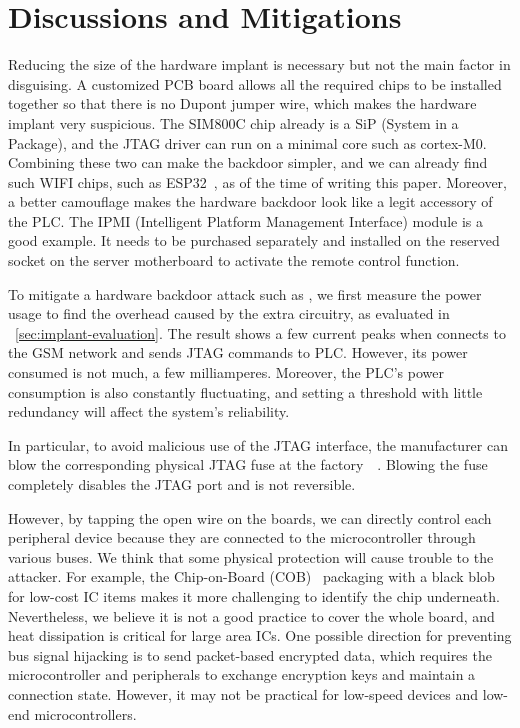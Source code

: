 \section{Discussions and Mitigations}
\label{sec:implant-discussion}

Reducing the size of the hardware implant is necessary but not the main factor in disguising. A customized PCB board allows all the required chips to be installed together so that there is no Dupont jumper wire, which makes the hardware implant very suspicious. The SIM800C chip already is a SiP (System in a Package), and the JTAG driver can run on a minimal core such as cortex-M0. Combining these two can make the backdoor simpler, and we can already find such WIFI chips, such as ESP32~\cite{pravalika2019internet}, as of the time of writing this paper. Moreover, a better camouflage makes the hardware backdoor look like a legit accessory of the PLC. The IPMI (Intelligent Platform Management Interface) module is a good example. It needs to be purchased separately and installed on the reserved socket on the server motherboard to activate the remote control function.

To mitigate a hardware backdoor attack such as \name, we first measure the power usage to find the overhead caused by the extra circuitry, as evaluated in ~\autoref{sec:implant-evaluation}. The result shows a few current peaks when \name connects to the GSM network and sends JTAG commands to PLC. However, its power consumed is not much, a few milliamperes. Moreover, the PLC's power consumption is also constantly fluctuating, and setting a threshold with little redundancy will affect the system's reliability.

In particular, to avoid malicious use of the JTAG interface, the manufacturer can blow the corresponding physical JTAG fuse at the factory~\cite{rosenfeld2010attacks}~\cite{buskey2006protected}. Blowing the fuse completely disables the JTAG port and is not reversible.

However, by tapping the open wire on the boards, we can directly control each peripheral device because they are connected to the microcontroller through various buses. We think that some physical protection will cause trouble to the attacker. For example, the Chip-on-Board (COB)~\cite{lau1994chip} packaging with a black blob for low-cost IC items makes it more challenging to identify the chip underneath. Nevertheless, we believe it is not a good practice to cover the whole board, and heat dissipation is critical for large area ICs. One possible direction for preventing bus signal hijacking is to send packet-based encrypted data, which requires the microcontroller and peripherals to exchange encryption keys and maintain a connection state. However, it may not be practical for low-speed devices and low-end microcontrollers.

